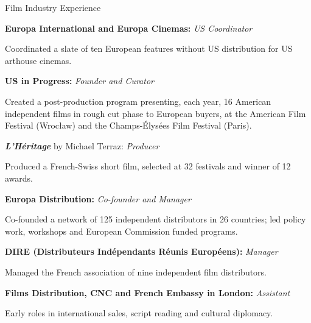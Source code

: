 \begin{rubric}{Film Industry Experience}

\entry*[2018]%
\textbf{Europa International and Europa Cinemas:} \textit{US Coordinator}
\par
Coordinated a slate of ten European features without US distribution for US arthouse cinemas.

\entry*[2012--2016]%
\textbf{US in Progress:} \textit{Founder and Curator}
\par
Created a post-production program presenting, each year, 16 American independent films in rough cut
phase to European buyers, at the American Film Festival (Wroc\l{}aw) and the Champs-\'Elys\'ees
Film Festival (Paris).

\entry*[2011--2012]%
\textbf{\textit{L'H\'eritage}} by Michael Terraz: \textit{Producer}
\par
Produced a French-Swiss short film, selected at 32 festivals and winner of 12 awards.

\entry*[2006--2013]%
\textbf{Europa Distribution:} \textit{Co-founder and Manager}
\par
Co-founded a network of 125 independent distributors in 26 countries; led policy work, workshops
and European Commission funded programs.

\entry*[2005--2007]%
\textbf{DIRE (Distributeurs Ind\'ependants R\'eunis Europ\'eens):} \textit{Manager}
\par
Managed the French association of nine independent film distributors.

\entry*[2003--2005]%
\textbf{Films Distribution, CNC and French Embassy in London:} \textit{Assistant}
\par
Early roles in international sales, script reading and cultural diplomacy.

\end{rubric}